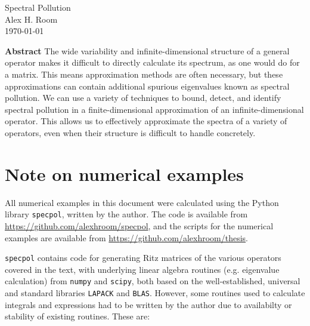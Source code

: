 \documentclass{article}
\newcommand{\1}{\mathbf{1}} %
\begin{document}
  \begin{titlepage}
    \vspace*{\fill}
    \begin{center}
      {\Huge Spectral Pollution}\\[0.5cm]
      {\Large Alex H. Room}\\[0.4cm]
      {\Large \today}
    \end{center}
     \vspace{\fill}
     {\normalsize\textbf{Abstract} 
     The wide variability and infinite-dimensional structure of a general operator makes it
     difficult to directly calculate its spectrum, as one would do for a matrix. This means
     approximation methods are often necessary, but these approximations can contain additional
     spurious eigenvalues known as spectral pollution. We can use a variety of techniques to
     bound, detect, and identify spectral pollution in a finite-dimensional approximation of
     an infinite-dimensional operator. This allows us to effectively approximate the spectra of
     a variety of operators, even when their structure is difficult to handle concretely.}
     \vspace*{\fill}
  \end{titlepage}
\tableofcontents










\appendix
{}
\section{Note on numerical examples}\label{sec:numerical-note}
All numerical examples in this document were calculated using the Python library \texttt{specpol}, written
by the author. The code is available from \url{https://github.com/alexhroom/specpol}, and the scripts for the
numerical examples are available from \url{https://github.com/alexhroom/thesis}.

\texttt{specpol} contains code for generating Ritz matrices of the various operators covered in the text,
with underlying linear algebra routines (e.g. eigenvalue calculation) from \texttt{numpy} and \texttt{scipy}, both based on the
well-established, universal and standard libraries \texttt{LAPACK} and \texttt{BLAS}. However, some routines used to calculate
integrals and expressions had to be written by the author due to availabilty or stability of existing routines. These are:
\end{document}
